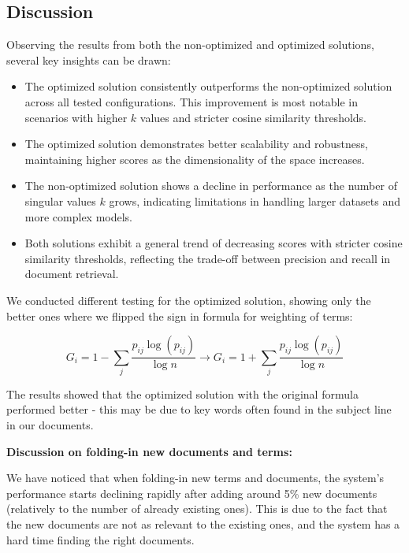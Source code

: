 \documentclass[12pt,a4paper]{article}
\begin{document}
\subsection{Discussion}
Observing the results from both the non-optimized and optimized solutions, several key insights can be drawn:
\begin{itemize}
    \item The optimized solution consistently outperforms the non-optimized solution across all tested configurations. This improvement is most notable in scenarios with higher \( k \) values and stricter cosine similarity thresholds.
    \item The optimized solution demonstrates better scalability and robustness, maintaining higher scores as the dimensionality of the space increases.
    \item The non-optimized solution shows a decline in performance as the number of singular values \( k \) grows, indicating limitations in handling larger datasets and more complex models.
    \item Both solutions exhibit a general trend of decreasing scores with stricter cosine similarity thresholds, reflecting the trade-off between precision and recall in document retrieval.    
\end{itemize}

\bigskip
\noindent We conducted different testing for the optimized solution, showing only the better ones where we flipped the sign in formula for weighting of terms:


\[ G_i = 1 - \sum_{j} \frac{p_{ij} \log (p_{ij})}{\log n} \rightarrow G_i = 1 + \sum_{j} \frac{p_{ij} \log (p_{ij})}{\log n} \]


\noindent The results showed that the optimized solution with the original formula performed better - this may be due to key words often found in the subject line in our documents.

\bigskip
\begin{flushleft}
    \textbf{Discussion on folding-in new documents and terms:}
\end{flushleft}


\noindent We have noticed that when folding-in new terms and documents, the system's performance starts declining rapidly after adding around 5\% new documents (relatively to the number of already existing ones). This is due to the fact that the new documents are not as relevant to the existing ones, and the system has a hard time finding the right documents. 
\end{document}
